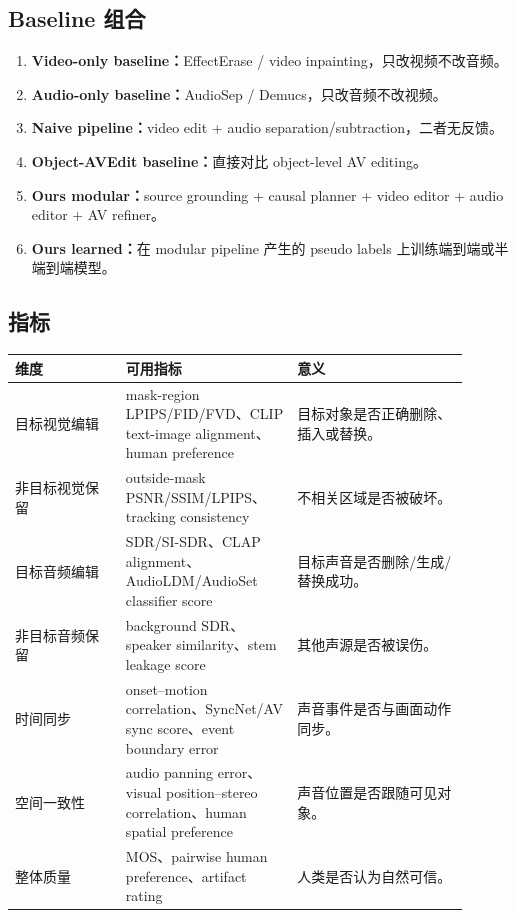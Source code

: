 \subsection{Baseline 组合}

\begin{enumerate}[leftmargin=2em]
  \item \textbf{Video-only baseline：}EffectErase / video inpainting，只改视频不改音频。
  \item \textbf{Audio-only baseline：}AudioSep / Demucs，只改音频不改视频。
  \item \textbf{Naive pipeline：}video edit + audio separation/subtraction，二者无反馈。
  \item \textbf{Object-AVEdit baseline：}直接对比 object-level AV editing。
  \item \textbf{Ours modular：}source grounding + causal planner + video editor + audio editor + AV refiner。
  \item \textbf{Ours learned：}在 modular pipeline 产生的 pseudo labels 上训练端到端或半端到端模型。
\end{enumerate}

\subsection{指标}

\begin{longtable}{p{0.22\linewidth}p{0.34\linewidth}p{0.34\linewidth}}
\toprule
\textbf{维度} & \textbf{可用指标} & \textbf{意义} \\
\midrule
目标视觉编辑 & mask-region LPIPS/FID/FVD、CLIP text-image alignment、human preference & 目标对象是否正确删除、插入或替换。 \\
\midrule
非目标视觉保留 & outside-mask PSNR/SSIM/LPIPS、tracking consistency & 不相关区域是否被破坏。 \\
\midrule
目标音频编辑 & SDR/SI-SDR、CLAP alignment、AudioLDM/AudioSet classifier score & 目标声音是否删除/生成/替换成功。 \\
\midrule
非目标音频保留 & background SDR、speaker similarity、stem leakage score & 其他声源是否被误伤。 \\
\midrule
时间同步 & onset--motion correlation、SyncNet/AV sync score、event boundary error & 声音事件是否与画面动作同步。 \\
\midrule
空间一致性 & audio panning error、visual position--stereo correlation、human spatial preference & 声音位置是否跟随可见对象。 \\
\midrule
整体质量 & MOS、pairwise human preference、artifact rating & 人类是否认为自然可信。 \\
\bottomrule
\end{longtable}

